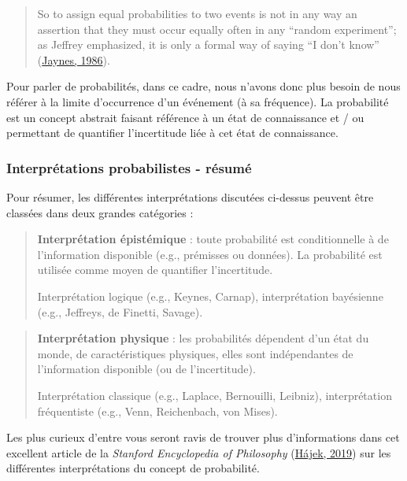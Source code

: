\documentclass[
  a4paper,11pt,twoside,onecolumn,openright,final,oldfontcommands]{memoir}
\theoremstyle{definition}
\theoremstyle{definition}
\theoremstyle{definition}
\theoremstyle{definition}
\theoremstyle{remark}
\begin{document}
\begin{quote}
So to assign equal probabilities to two events is not in any way an assertion that they must occur equally often in any ``random experiment''; as Jeffrey emphasized, it is only a formal way of saying ``I don't know'' (\protect\hyperlink{ref-jaynes_bayesian_1986}{Jaynes, 1986}).
\end{quote}

Pour parler de probabilités, dans ce cadre, nous n'avons donc plus besoin de nous référer à la limite d'occurrence d'un événement (à sa fréquence). La probabilité est un concept abstrait faisant référence à un état de connaissance et / ou permettant de quantifier l'incertitude liée à cet état de connaissance.

\hypertarget{interpruxe9tations-probabilistes---ruxe9sumuxe9}{%
\subsubsection{Interprétations probabilistes - résumé}\label{interpruxe9tations-probabilistes---ruxe9sumuxe9}}

Pour résumer, les différentes interprétations discutées ci-dessus peuvent être classées dans deux grandes catégories :

\begin{quote}
\textbf{Interprétation épistémique} : toute probabilité est conditionnelle à de l'information disponible (e.g., prémisses ou données). La probabilité est utilisée comme moyen de quantifier l'incertitude.

Interprétation logique (e.g., Keynes, Carnap), interprétation bayésienne (e.g., Jeffreys, de Finetti, Savage).
\end{quote}

\begin{quote}
\textbf{Interprétation physique} : les probabilités dépendent d'un état du monde, de caractéristiques physiques, elles sont indépendantes de l'information disponible (ou de l'incertitude).

Interprétation classique (e.g., Laplace, Bernouilli, Leibniz), interprétation fréquentiste (e.g., Venn, Reichenbach, von Mises).
\end{quote}

Les plus curieux d'entre vous seront ravis de trouver plus d'informations dans cet excellent article de la \emph{Stanford Encyclopedia of Philosophy} (\protect\hyperlink{ref-sep-probability-interpret}{Hájek, 2019}) sur les différentes interprétations du concept de probabilité.
\end{document}
